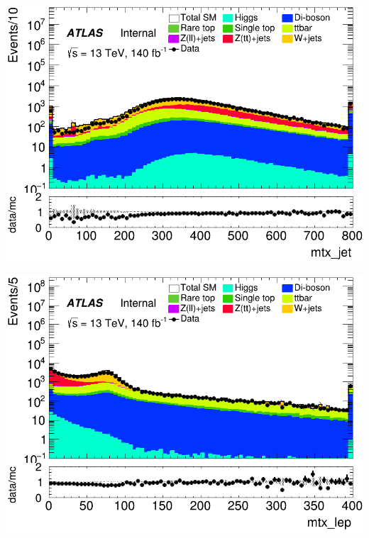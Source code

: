 \documentclass[usenames,dvipsnames]{beamer}
\begin{document}
\begin{frame}
    \begin{minipage}{0.32\textwidth}
        \centering
        \includegraphics[width=\textwidth]{graphics/LH_met/LH_met_mtx_jet.png}
    \end{minipage}
        \hfill
    \begin{minipage}{0.32\textwidth}
        \centering
        \includegraphics[width=\textwidth]{graphics/LH_met/LH_met_mtx_lep.png}
    \end{minipage}
    \hfill
    \begin{minipage}{0.32\textwidth}
        \centering

\end{minipage}
\end{frame}
\end{document}
